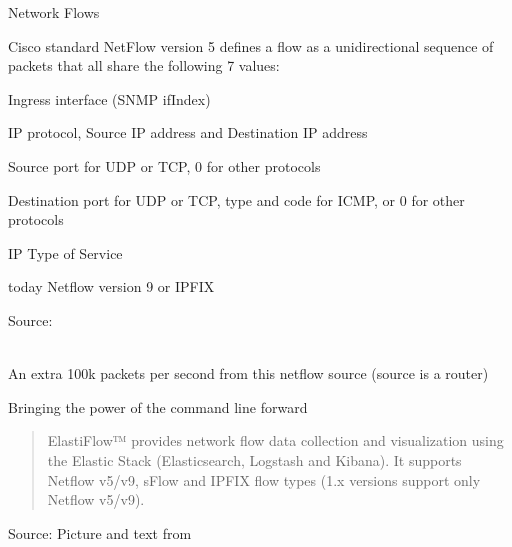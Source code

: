 \documentclass[Screen16to9,17pt]{foils}
\begin{document}
\begin{list1}
\item Network Flows
\item Cisco standard NetFlow version 5 defines a flow as a unidirectional sequence of packets that all share the following 7 values:
\begin{list2}
\item Ingress interface (SNMP ifIndex)
\item IP protocol, Source IP address and Destination IP address
\item Source port for UDP or TCP, 0 for other protocols
\item Destination port for UDP or TCP, type and code for ICMP, or 0 for other protocols
\item IP Type of Service
\end{list2}
\item today Netflow version 9 or IPFIX
\end{list1}

Source: \\{\footnotesize
{}\\
}








\centerline{An extra 100k packets per second from this netflow source (source is a router)}



\centerline{Bringing the power of the command line forward}



\begin{quote}
  ElastiFlow™ provides network flow data collection and visualization using the Elastic Stack (Elasticsearch, Logstash and Kibana). It supports Netflow v5/v9, sFlow and IPFIX flow types (1.x versions support only Netflow v5/v9).
\end{quote}
Source: Picture and text from  \\
\end{document}
